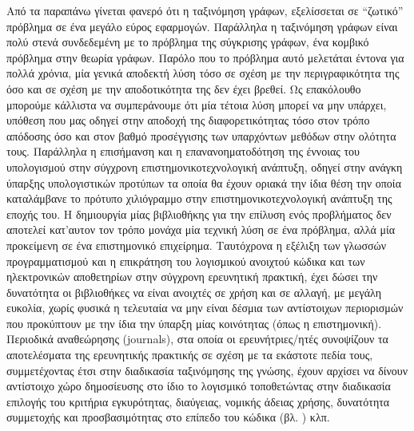 Από τα παραπάνω γίνεται φανερό ότι η ταξινόμηση γράφων, εξελίσσεται σε ``ζωτικό'' πρόβλημα σε ένα μεγάλο εύρος εφαρμογών.
Παράλληλα η ταξινόμηση γράφων είναι πολύ στενά συνδεδεμένη με το πρόβλημα της σύγκρισης γράφων, ένα κομβικό πρόβλημα στην θεωρία γράφων.
Παρόλο που το πρόβλημα αυτό μελετάται έντονα για πολλά χρόνια, μία γενικά αποδεκτή λύση τόσο σε σχέση με την περιγραφικότητα της όσο και σε σχέση με την αποδοτικότητα της δεν έχει βρεθεί.
Ως επακόλουθο μπορούμε κάλλιστα να συμπεράνουμε ότι μία τέτοια λύση μπορεί να μην υπάρχει, υπόθεση που μας οδηγεί στην αποδοχή της διαφορετικότητας τόσο στον τρόπο απόδοσης όσο και στον βαθμό προσέγγισης των υπαρχόντων μεθόδων στην ολότητα τους.
Παράλληλα η επισήμανση και η επανανοηματοδότηση της έννοιας του υπολογισμού στην σύγχρονη επιστημονικοτεχνολογική ανάπτυξη, οδηγεί στην ανάγκη ύπαρξης υπολογιστικών προτύπων τα οποία θα έχουν οριακά την ίδια θέση την οποία καταλάμβανε το πρότυπο χιλιόγραμμο στην επιστημονικοτεχνολογική ανάπτυξη της εποχής του.
Η δημιουργία μίας βιβλιοθήκης για την επίλυση ενός προβλήματος δεν αποτελεί κατ'αυτον τον τρόπο μονάχα μία τεχνική λύση σε ένα πρόβλημα, αλλά μία προκείμενη σε ένα επιστημονικό επιχείρημα.
Ταυτόχρονα η εξέλιξη των γλωσσών προγραμματισμού και η επικράτηση του λογισμικού ανοιχτού κώδικα και των ηλεκτρονικών αποθετηρίων στην σύγχρονη ερευνητική πρακτική, έχει δώσει την δυνατότητα οι βιβλιοθήκες να είναι ανοιχτές σε χρήση και σε αλλαγή, με μεγάλη ευκολία, χωρίς φυσικά η τελευταία να μην είναι δέσμια των αντίστοιχων περιορισμών που προκύπτουν με την ίδια την ύπαρξη μίας κοινότητας (όπως η επιστημονική).
Περιοδικά αναθεώρησης (journals), στα οποία οι ερευνήτριες/ητές συνοψίζουν τα αποτελέσματα της ερευνητικής πρακτικής σε σχέση με τα εκάστοτε πεδία τους, συμμετέχοντας έτσι στην διαδικασία ταξινόμησης της γνώσης, έχουν αρχίσει να δίνουν αντίστοιχο χώρο δημοσίευσης στο ίδιο το λογισμικό τοποθετώντας στην διαδικασία επιλογής του κριτήρια εγκυρότητας, διαύγειας, νομικής άδειας χρήσης, δυνατότητα συμμετοχής και προσβασιμότητας στο επίπεδο του κώδικα (βλ. \href{http://www.jmlr.org/mloss/mloss-info.html}{}) κλπ.

